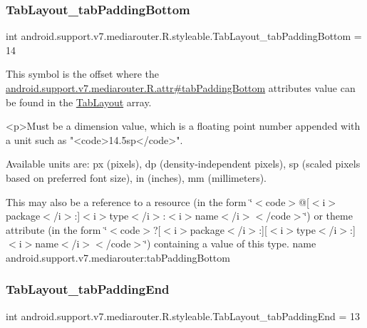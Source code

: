\subsubsection{\texorpdfstring{Tab\+Layout\+\_\+tab\+Padding\+Bottom}{TabLayout\_tabPaddingBottom}}
{\footnotesize\ttfamily int android.\+support.\+v7.\+mediarouter.\+R.\+styleable.\+Tab\+Layout\+\_\+tab\+Padding\+Bottom = 14\hspace{0.3cm}{\ttfamily [static]}}

This symbol is the offset where the \hyperlink{classandroid_1_1support_1_1v7_1_1mediarouter_1_1R_1_1attr_acc5b736693f1ab432a5ce0a3ee4d4b82}{android.\+support.\+v7.\+mediarouter.\+R.\+attr\#tab\+Padding\+Bottom} attribute\textquotesingle{}s value can be found in the \hyperlink{classandroid_1_1support_1_1v7_1_1mediarouter_1_1R_1_1styleable_a94de1350e0a902b4a974d775f2f4f25e}{Tab\+Layout} array.

\begin{DoxyVerb}      <p>Must be a dimension value, which is a floating point number appended with a unit such as "<code>14.5sp</code>".
\end{DoxyVerb}
 Available units are\+: px (pixels), dp (density-\/independent pixels), sp (scaled pixels based on preferred font size), in (inches), mm (millimeters). 

This may also be a reference to a resource (in the form \char`\"{}$<$code$>$@\mbox{[}$<$i$>$package$<$/i$>$\+:\mbox{]}$<$i$>$type$<$/i$>$\+:$<$i$>$name$<$/i$>$$<$/code$>$\char`\"{}) or theme attribute (in the form \char`\"{}$<$code$>$?\mbox{[}$<$i$>$package$<$/i$>$\+:\mbox{]}\mbox{[}$<$i$>$type$<$/i$>$\+:\mbox{]}$<$i$>$name$<$/i$>$$<$/code$>$\char`\"{}) containing a value of this type.  name android.\+support.\+v7.\+mediarouter\+:tab\+Padding\+Bottom \mbox{\label{classandroid_1_1support_1_1v7_1_1mediarouter_1_1R_1_1styleable_a4dcd3a733efad4f87d80f65b2a766010}} 
\subsubsection{\texorpdfstring{Tab\+Layout\+\_\+tab\+Padding\+End}{TabLayout\_tabPaddingEnd}}
{\footnotesize\ttfamily int android.\+support.\+v7.\+mediarouter.\+R.\+styleable.\+Tab\+Layout\+\_\+tab\+Padding\+End = 13\hspace{0.3cm}{\ttfamily [static]}}

